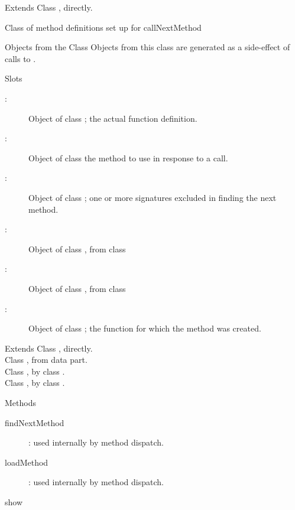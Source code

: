 %
\begin{Section}{Extends}
Class , directly.
\end{Section}
%
\begin{Description}\relax
 Class of method definitions set up for callNextMethod 
\end{Description}
%
\begin{Section}{Objects from the Class}
Objects from this class are generated as a side-effect of calls to
.
\end{Section}
%
\begin{Section}{Slots}
\begin{description}

\item[:] Object of class ; the actual
function definition.
\item[:] Object of class 
the method to use in response to a 
call.
\item[:] Object of class ; one or more
signatures excluded in finding the next method. 
\item[:] Object of class , from class
\item[:] Object of class , from
class 
\item[:] Object of class ; the function
for which the method was created. 

\end{description}

\end{Section}
%
\begin{Section}{Extends}
Class , directly.\\{}
Class , from data part.\\{}
Class , by class .\\{}
Class , by class .
\end{Section}
%
\begin{Section}{Methods}
\begin{description}

\item[findNextMethod] :
used internally by method dispatch. 
\item[loadMethod] : used
internally by method dispatch. 
\item[show]  

\end{description}

\end{Section}
